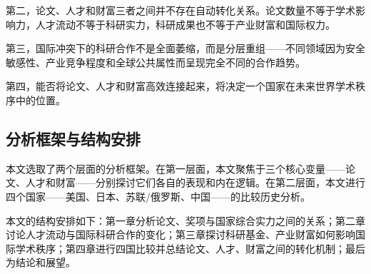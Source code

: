 第二，论文、人才和财富三者之间并不存在自动转化关系。论文数量不等于学术影响力，人才流动不等于科研实力，科研成果也不等于产业财富和国际权力。

第三，国际冲突下的科研合作不是全面萎缩，而是分层重组——不同领域因为安全敏感性、产业竞争程度和全球公共属性而呈现完全不同的合作趋势。

第四，能否将论文、人才和财富高效连接起来，将决定一个国家在未来世界学术秩序中的位置。

\subsection{分析框架与结构安排}

本文选取了两个层面的分析框架。在第一层面，本文聚焦于三个核心变量——论文、人才和财富——分别探讨它们各自的表现和内在逻辑。在第二层面，本文进行四个国家——美国、日本、苏联/俄罗斯、中国——的比较历史分析。

本文的结构安排如下：第一章分析论文、奖项与国家综合实力之间的关系；第二章讨论人才流动与国际科研合作的变化；第三章探讨科研基金、产业财富如何影响国际学术秩序；第四章进行四国比较并总结论文、人才、财富之间的转化机制；最后为结论和展望。
